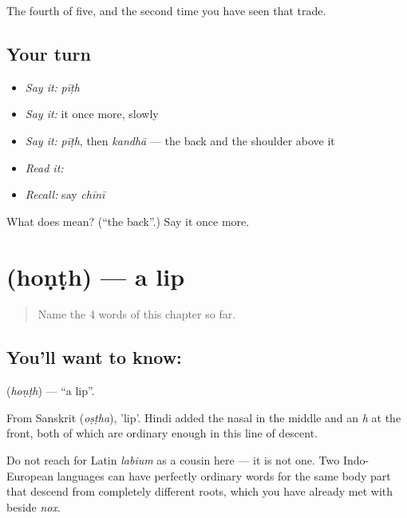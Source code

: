 \begin{grammarlens}[title={What you've built}]
The fourth of five, and the second time you have seen that trade.
\end{grammarlens}

\subsection*{Your turn}
\begin{itemize}
\raggedright
  \item \emph{Say it:} \emph{pīṭh}
  \item \emph{Say it:} it once more, slowly
  \item \emph{Say it:} \emph{pīṭh}, then \emph{kandhā} — the back and the shoulder above it
  \item \emph{Read it:} \textbf{}
  \item \emph{Recall:} say \emph{chīnī}
\end{itemize}

\begin{tcolorbox}[breakable,colback=teal!4,colframe=teal!35!black,title={Before you move on}]
What does  mean? (\textquotedblleft{}the back\textquotedblright{}.) Say it once more.
\end{tcolorbox}
\section[\texorpdfstring{\hi{होंठ} (hoṇṭh)}{होंठ (hoṇṭh)}]{ (hoṇṭh) — a lip}

\label{lesson:HI-C53-lip}



\begin{quote}
Name the 4 words of this chapter so far.
\end{quote}

\subsection*{You'll want to know: }
\textbf{} (\emph{hoṇṭh}) — \textquotedblleft{}a lip\textquotedblright{}.

From Sanskrit  (\emph{oṣṭha}), 'lip'. Hindi added the nasal in the middle and an \emph{h} at the front, both of which are ordinary enough in this line of descent.

Do not reach for Latin \emph{labium} as a cousin here — it is not one. Two Indo-European languages can have perfectly ordinary words for the same body part that descend from completely different roots, which you have already met with  beside \emph{nox}.

